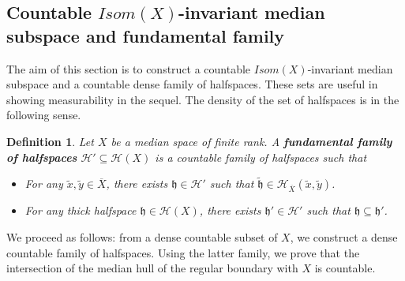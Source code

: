 \documentclass{amsart}
\numberwithin{equation}{section}
\newtheorem{defi}[thm]{Definition}
\newcommand{\HH}{\mathcal{H}}     %
\newcommand{\hh}{\mathfrak{h}}    %
\theoremstyle{definition}
\def\bar{\overline}
\begin{document}
\subsection{\texorpdfstring{Countable $Isom(X)$-invariant median subspace and fundamental family}{Countable Isom(X)-invariant median subspace and fundamental family}} \label{subsection_fundamental_family}

The aim of this section is to construct a countable $Isom(X)$-invariant median subspace and a countable dense family of halfspaces. These sets are useful in showing measurability in the sequel. The density of the set of halfspaces is in the following sense.
\begin{defi}\label{def_fundamental_family}
    Let $X$ be a median space of finite rank. A \textbf{\textit{fundamental family of halfspaces}} $\HH'\subseteq\HH(X)$ is a countable family of halfspaces such that
    \begin{itemize}
     \item[(1)] For any $\tilde{x},\tilde{y}\in \bar{X}$, there exists $\hh\in\HH'$ such that $\tilde{\hh}\in\HH_{\bar{X}}(\tilde{x},\tilde{y})$.
        \item[(2)] For any thick halfspace $\hh\in\HH(X)$, there exists $\hh'\in \HH'$ such that $\hh\subseteq \hh'$.
    \end{itemize}
\end{defi}
We proceed as follows: from a dense countable subset of $X$, we construct a dense countable family of halfspaces. Using the latter family, we prove that the intersection of the median hull of the regular boundary with $X$ is countable.\par
\end{document}
